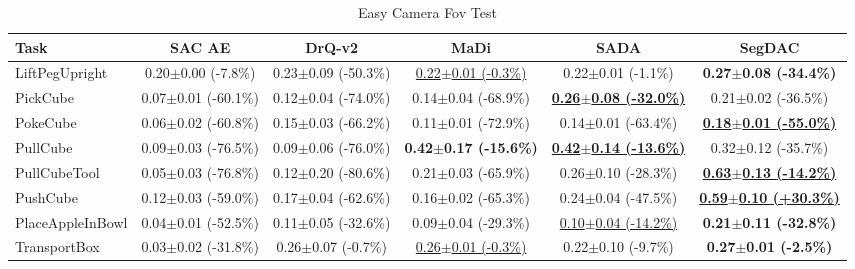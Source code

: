 
\begin{table}[htbp]
\centering
\scriptsize
\caption{Easy Camera Fov Test}
\label{tab:appendix_camerafovtest_easy}
\begin{adjustbox}{max width=\textwidth}
\begin{tabular}{l*{5}{c}}
\toprule
\textbf{Task} & \textbf{SAC AE} & \textbf{DrQ-v2} & \textbf{MaDi} & \textbf{SADA} & \textbf{SegDAC} \\
\midrule
LiftPegUpright & 0.20$\pm$0.00 \scriptsize{(-7.8\%)} & 0.23$\pm$0.09 \scriptsize{(-50.3\%)} & \underline{0.22$\pm$0.01 \scriptsize{(-0.3\%)}} & 0.22$\pm$0.01 \scriptsize{(-1.1\%)} & \textbf{0.27$\pm$0.08 \scriptsize{(-34.4\%)}} \\
PickCube & 0.07$\pm$0.01 \scriptsize{(-60.1\%)} & 0.12$\pm$0.04 \scriptsize{(-74.0\%)} & 0.14$\pm$0.04 \scriptsize{(-68.9\%)} & \textbf{\underline{0.26$\pm$0.08 \scriptsize{(-32.0\%)}}} & 0.21$\pm$0.02 \scriptsize{(-36.5\%)} \\
PokeCube & 0.06$\pm$0.02 \scriptsize{(-60.8\%)} & 0.15$\pm$0.03 \scriptsize{(-66.2\%)} & 0.11$\pm$0.01 \scriptsize{(-72.9\%)} & 0.14$\pm$0.01 \scriptsize{(-63.4\%)} & \textbf{\underline{0.18$\pm$0.01 \scriptsize{(-55.0\%)}}} \\
PullCube & 0.09$\pm$0.03 \scriptsize{(-76.5\%)} & 0.09$\pm$0.06 \scriptsize{(-76.0\%)} & \textbf{0.42$\pm$0.17 \scriptsize{(-15.6\%)}} & \textbf{\underline{0.42$\pm$0.14 \scriptsize{(-13.6\%)}}} & 0.32$\pm$0.12 \scriptsize{(-35.7\%)} \\
PullCubeTool & 0.05$\pm$0.03 \scriptsize{(-76.8\%)} & 0.12$\pm$0.20 \scriptsize{(-80.6\%)} & 0.21$\pm$0.03 \scriptsize{(-65.9\%)} & 0.26$\pm$0.10 \scriptsize{(-28.3\%)} & \textbf{\underline{0.63$\pm$0.13 \scriptsize{(-14.2\%)}}} \\
PushCube & 0.12$\pm$0.03 \scriptsize{(-59.0\%)} & 0.17$\pm$0.04 \scriptsize{(-62.6\%)} & 0.16$\pm$0.02 \scriptsize{(-65.3\%)} & 0.24$\pm$0.04 \scriptsize{(-47.5\%)} & \textbf{\underline{0.59$\pm$0.10 \scriptsize{(+30.3\%)}}} \\
PlaceAppleInBowl & 0.04$\pm$0.01 \scriptsize{(-52.5\%)} & 0.11$\pm$0.05 \scriptsize{(-32.6\%)} & 0.09$\pm$0.04 \scriptsize{(-29.3\%)} & \underline{0.10$\pm$0.04 \scriptsize{(-14.2\%)}} & \textbf{0.21$\pm$0.11 \scriptsize{(-32.8\%)}} \\
TransportBox & 0.03$\pm$0.02 \scriptsize{(-31.8\%)} & 0.26$\pm$0.07 \scriptsize{(-0.7\%)} & \underline{0.26$\pm$0.01 \scriptsize{(-0.3\%)}} & 0.22$\pm$0.10 \scriptsize{(-9.7\%)} & \textbf{0.27$\pm$0.01 \scriptsize{(-2.5\%)}} \\
\bottomrule
\end{tabular}
\end{adjustbox}
\end{table}


